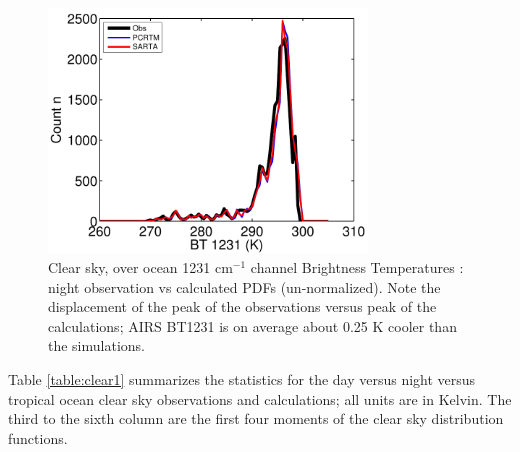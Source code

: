 \documentclass[agupp]{aguplus}              %
\newcommand{\wn}{cm$^{-1}$\xspace}
\begin{document}
\begin{article}
\begin{figure}[h]
\noindent\includegraphics[width=20pc]{FIGS/ecm_clearBT1231_pdf}
\caption{Clear sky, over ocean  1231 \wn channel Brightness Temperatures : night 
observation vs calculated PDFs (un-normalized). Note the displacement of the peak of the 
observations versus peak of the calculations; AIRS BT1231 is on average about 0.25 K cooler 
than the simulations.}
\label{bt1231_clear_obs_pdf}
\end{figure}

Table \ref{table:clear1} summarizes the statistics for the day versus
night versus tropical ocean clear sky observations and calculations;
all units are in Kelvin. The third to the sixth column are the first
four moments of the clear sky distribution functions. 


\end{article}
\end{document}
